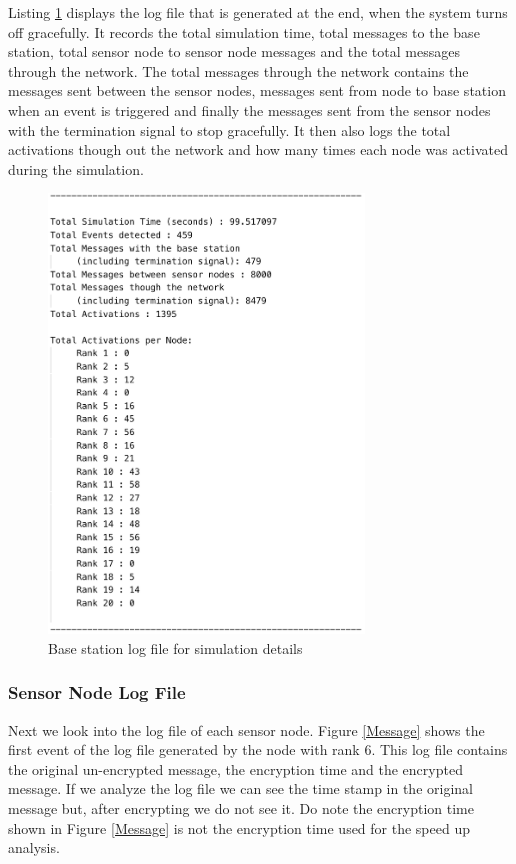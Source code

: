\documentclass[conference]{IEEEtran}
\begin{document}
	
	Listing \ref{lst:log2} displays the log file that is generated at the end, when the system turns off gracefully. It records the total simulation time, total messages to the base station, total sensor node to sensor node messages and the total messages through the network. The total messages through the network contains the messages sent between the sensor nodes, messages sent from node to base station when an event is triggered and finally the messages sent from the  sensor nodes with the termination signal to stop gracefully.  It then also logs the total activations though out the network and how many times each node was activated during the simulation. 
	
	\begin{figure}[!h]
		\centering
		\includegraphics[width=3.3in,keepaspectratio]{logS}
		\caption{Base station log file for simulation details}
		\label{lst:log2}
	\end{figure}	
	
	\subsubsection{Sensor Node Log File}
	
	Next we look into the log file of each sensor node. Figure \ref{Message} shows the first event of the log file generated by the node with rank 6. This log file contains the original un-encrypted message, the encryption time and the encrypted message. If we analyze the log file we can see the time stamp in the original message but, after encrypting we do not see it. Do note the encryption time shown in Figure  \ref{Message} is not the encryption time used for the speed up analysis.
	
\end{document}
